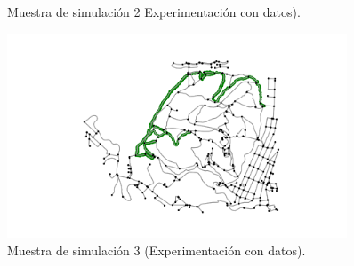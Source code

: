\begin{figure}[!htb]
\begin{minipage}{0.48\textwidth}
\caption{Muestra de simulación 2 Experimentación con datos).}
\label{figure:SimulatedTrack2}
\end{minipage}
\hfill 
\begin{minipage}{0.48\textwidth}
\includegraphics[width=0.9\textwidth]{./Imagenes/SimulatedTrack3.png}
\caption{Muestra de simulación 3 (Experimentación con datos).}
\label{figure:SimulatedTrack3}
\end{minipage}
\end{figure}
\newpage

